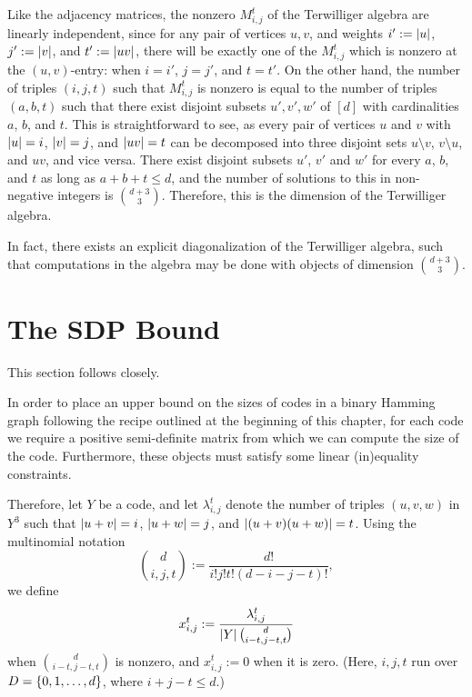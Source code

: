 \documentclass{report}
\newcommand{\wt}[1]{\abs{ #1 }}
\newcommand{\lijt}{\lambda_{i, j}^t}
\newcommand{\xijt}{x_{i, j}^t}
\newcommand{\Mijt}{M_{i, j}^t}
\begin{document}
    Like the adjacency matrices, the nonzero $\Mijt$ of the Terwilliger algebra
    are linearly independent, since for any pair of vertices $u, v$, and weights
    $i' := \wt{u}$, $j' := \wt{v}$, and $t' := \wt{uv}$, there will be exactly
    one of the $\Mijt$ which is nonzero at the $(u, v)$-entry: when $i = i'$,
    $j = j'$, and $t = t'$.  On the other hand, the number of triples $(i, j,
    t)$ such that $\Mijt$ is nonzero is equal to the number of triples $(a, b,
    t)$ such that there exist disjoint subsets $u', v', w'$ of $[d]$ with
    cardinalities $a$, $b$, and $t$.  This is straightforward to see, as every
    pair of vertices $u$ and $v$ with $\wt{u} = i$, $\wt{v} = j$, and $\wt{uv} =
    t$ can be decomposed into three disjoint sets $u \setminus v$, $v \setminus
    u$, and $uv$, and vice versa.  There exist disjoint subsets $u'$, $v'$ and
    $w'$ for every $a$, $b$, and $t$ as long as $a + b + t \leq d$, and the
    number of solutions to this in non-negative integers is $\binom{d+3}{3}$.
    Therefore, this is the dimension of the Terwilliger algebra.

    In fact, there exists an explicit diagonalization of the Terwilliger
    algebra, such that computations in the algebra may be done with objects of
    dimension $\binom{d+3}{3}$.

  \FloatBarrier
  \section{The SDP Bound}\label{sec:SDP-bound:SDP-bound}

    This section follows \cite[Subsection I. B]{schrijver} closely.

    In order to place an upper bound on the sizes of codes in a binary Hamming
    graph following the recipe outlined at the beginning of this chapter, for
    each code we require a positive semi-definite matrix from which we can
    compute the size of the code.  Furthermore, these objects must satisfy some
    linear (in)equality constraints.

    Therefore, let $Y$ be a code, and let $\lijt$ denote the number of triples
    $(u, v, w)$ in $Y^3$ such that $\wt{u + v} = i$, $\wt{u + w} = j$, and
    $\wt{(u+v)(u+w)} = t$.  Using the multinomial notation
    $$
      \binom{d}{i, j, t} := \frac{d!}{i! j! t! (d - i - j - t)!},
    $$
    we define
    \begin{equation}
      \xijt := \frac{\lijt}{\abs{Y} \binom{d}{i - t, j - t, t}}
    \end{equation}
    when $\binom{d}{i-t, j-t, t}$ is nonzero, and $\xijt := 0$ when it is zero.
    (Here, $i, j, t$ run over $D = \left\lbrace 0, 1, \ldots, d \right\rbrace$, where $i + j - t \leq
    d$.)
\end{document}
